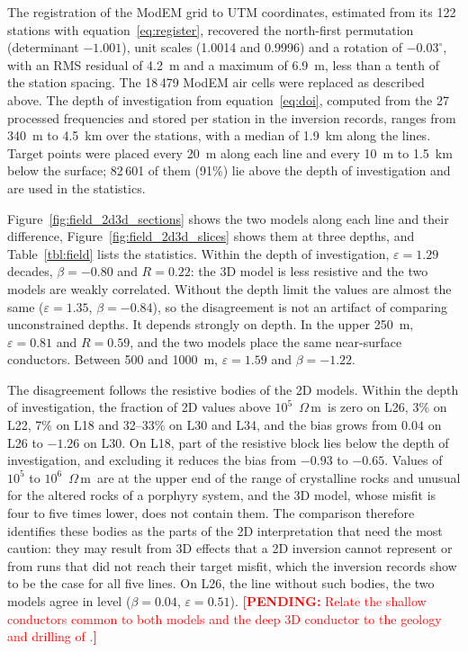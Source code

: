 \documentclass[manuscript]{geophysics}
\DeclareRobustCommand{\pending}[1]{\textcolor{red}{\textbf{[PENDING:} #1\textbf{]}}}
\newcommand{\ohmm}{\ensuremath{\Omega\,\mathrm{m}}}
\begin{document}
The registration of the ModEM grid to UTM coordinates, estimated from
its 122 stations with equation~\ref{eq:register}, recovered the
north-first permutation (determinant $-1.001$), unit scales (1.0014 and
0.9996) and a rotation of $-0.03^\circ$, with an RMS residual of 4.2~m
and a maximum of 6.9~m, less than a tenth of the station spacing. The
18\,479 ModEM air cells were replaced as described above. The depth of
investigation from equation~\ref{eq:doi}, computed from the 27
processed frequencies and stored per station in the inversion records,
ranges from 340~m to 4.5~km over the stations, with a median of
1.9~km along the lines. Target points were
placed every 20~m along each line and every 10~m to 1.5~km below the
surface; 82\,601 of them (91\%) lie above the depth of investigation
and are used in the statistics.

Figure~\ref{fig:field_2d3d_sections} shows the two models along each
line and their difference, Figure~\ref{fig:field_2d3d_slices} shows
them at three depths, and Table~\ref{tbl:field} lists the statistics.
Within the depth of investigation, $\varepsilon = 1.29$ decades,
$\beta = -0.80$ and $R = 0.22$: the 3D model is less resistive and the
two models are weakly correlated. Without the depth limit the values
are almost the same ($\varepsilon = 1.35$, $\beta = -0.84$), so the
disagreement is not an artifact of comparing unconstrained depths. It
depends strongly on depth. In the upper 250~m, $\varepsilon = 0.81$
and $R = 0.59$, and the two models place the same near-surface
conductors. Between 500 and 1000~m, $\varepsilon = 1.59$ and
$\beta = -1.22$.

The disagreement follows the resistive bodies of the 2D models. Within
the depth of investigation, the fraction of 2D values above
$10^{5}$~\ohmm\ is zero on L26, 3\% on L22, 7\% on L18 and 32--33\% on
L30 and L34, and the bias grows from $0.04$ on L26 to $-1.26$ on L30.
On L18, part of the resistive block lies below the depth of
investigation, and excluding it reduces the bias from $-0.93$ to
$-0.65$. Values of $10^{5}$ to $10^{6}$~\ohmm\ are at the upper end of
the range of crystalline rocks and unusual for the altered rocks of a
porphyry system, and the 3D model, whose misfit is four to five times
lower, does not contain them. The comparison therefore identifies
these bodies as the parts of the 2D interpretation that need the most
caution: they may result from 3D effects that a 2D inversion cannot
represent \citep{Ledo2005} or from runs that did not reach their
target misfit, which the inversion records show to be the case for
all five lines. On L26, the line without such bodies, the two models
agree in level ($\beta = 0.04$, $\varepsilon = 0.51$).
\pending{Relate the shallow conductors common to both models and the
deep 3D conductor to the geology and drilling of
\citet{Kouabena2025}.}
\end{document}
